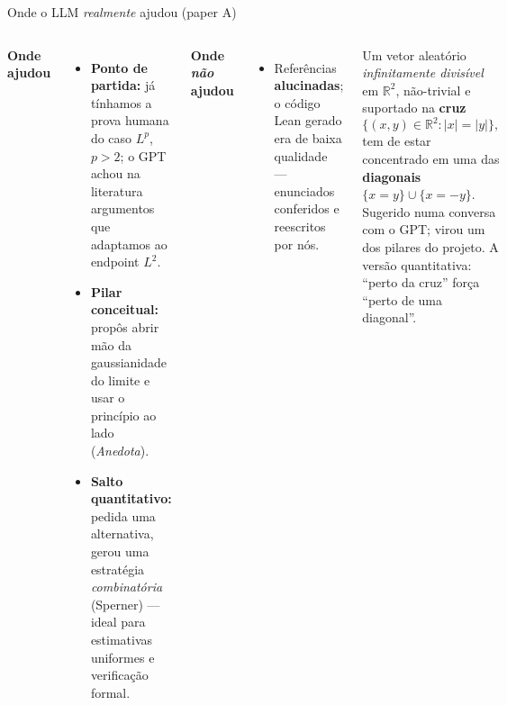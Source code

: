 \documentclass[10pt,aspectratio=169]{beamer}
\newcommand{\R}{\mathbb{R}}
\newcommand{\abs}[1]{\left|#1\right|}
\newcommand{\hl}[1]{{\color{accent}\textbf{#1}}}
\newcommand{\hlb}[1]{{\color{accent2}\textbf{#1}}}
\newcommand{\hlo}[1]{{\color{accent3}\textbf{#1}}}
\newcommand{\fade}[1]{{\color{fgmute}#1}}
\begin{document}
\begin{frame}{Onde o LLM \emph{realmente} ajudou (paper A)}
  \begin{columns}[T,onlytextwidth]
    \textbf{\color{accent}Onde ajudou}
    \begin{itemize}\small
      \setlength{\itemsep}{0.3em}
      \item \hl{Ponto de partida:} já tínhamos a prova humana do caso
            $L^p$, $p>2$; o GPT achou na literatura argumentos que
            adaptamos ao endpoint $L^2$.
      \item \hl{Pilar conceitual:} propôs abrir mão da gaussianidade
            do limite e usar o princípio ao lado (\emph{Anedota}).
      \item \hl{Salto quantitativo:} pedida uma alternativa, gerou
            uma estratégia \emph{combinatória} (Sperner) --- ideal
            para estimativas uniformes e verificação formal.
    \end{itemize}
    \vspace{0.35em}
    \pause
    \textbf{\color{accentred}Onde \emph{não} ajudou}
    \begin{itemize}\small
      \item Referências \hlo{alucinadas}; o código Lean gerado era de
            baixa qualidade --- enunciados conferidos e reescritos
            por nós.
    \end{itemize}

    \pause
    \begin{tcolorbox}[colback=bgpanel,colframe=accent,arc=2pt,boxrule=0.5pt,
                       left=8pt,right=8pt,top=6pt,bottom=6pt,
                       title={\sffamily\bfseries\small Anedota --- o princípio que destravou},
                       coltitle=bgdark,fonttitle=\small]
      \small\color{fgmain}
      Um vetor aleatório \emph{infinitamente divisível} em $\R^2$,
      não-trivial e suportado na \hl{cruz}
      \[
        \{(x,y)\in\R^2:\abs{x}=\abs{y}\},
      \]
      tem de estar concentrado em uma das \hlb{diagonais}
      $\{x=y\}\cup\{x=-y\}$.\\[0.4em]
      \fade{\scriptsize Sugerido numa conversa com o GPT; virou um dos
      pilares do projeto. A versão quantitativa: ``perto da cruz''
      força ``perto de uma diagonal''.}
    \end{tcolorbox}
  \end{columns}
\end{frame}
\end{document}
